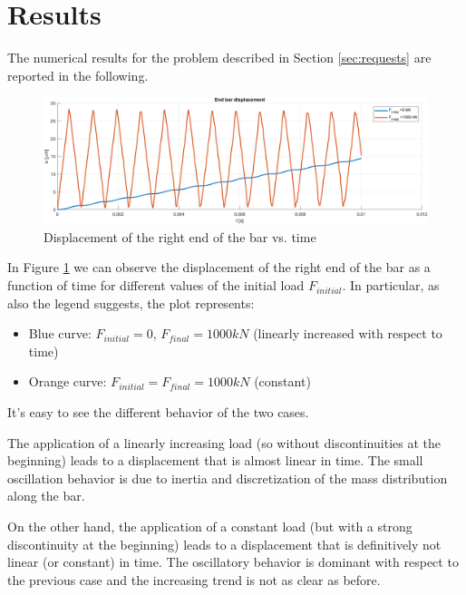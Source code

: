 \section{Results}
\label{sec:results}

The numerical results for the problem described in Section \ref{sec:requests} are reported in the following.

\begin{figure}[H]
    \centering
    \includegraphics[width=\textwidth]{img/end_bar_displacement_2.png}
    \caption{Displacement of the right end of the bar vs. time}
    \label{fig:final_displacement}
\end{figure}

In Figure \ref{fig:final_displacement} we can observe the displacement of the right end of the bar as a function of time for different values of the initial load $F_{initial}$.
In particular, as also the legend suggests, the plot represents:

\begin{itemize}
    \item Blue curve: $F_{initial} = 0$, $F_{final} = 1000kN$ (linearly increased with respect to time)
    \item Orange curve: $F_{initial} = F_{final} = 1000kN$ (constant)
\end{itemize}

It's easy to see the different behavior of the two cases.

The application of a linearly increasing load (so without discontinuities at the beginning) leads to a displacement that is almost linear in time.
The small oscillation behavior is due to inertia and discretization of the mass distribution along the bar.

On the other hand, the application of a constant load (but with a strong discontinuity at the beginning) leads to a displacement that is definitively not linear (or constant) in time.
The oscillatory behavior is dominant with respect to the previous case and the increasing trend is not as clear as before.


